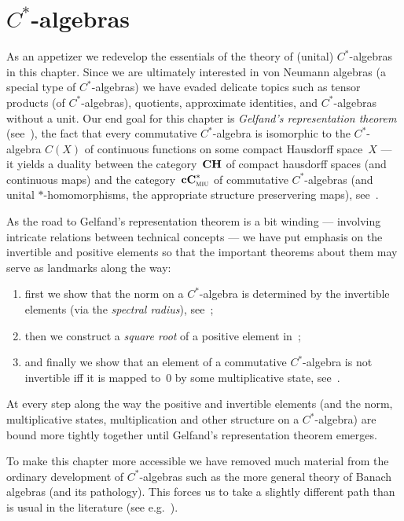 \documentclass[a]{subfiles}
\begin{document}
\chapter{$C^*$-algebras}
As an appetizer
we redevelop the essentials of the theory of (unital) $C^*$-algebras
in this chapter.
Since we are ultimately interested
in von Neumann algebras
(a special type of $C^*$-algebras)
we have evaded
delicate
topics such as tensor products (of $C^*$-algebras), 
quotients, approximate identities,
and $C^*$-algebras without a unit.
Our end goal
for this chapter
is \emph{Gelfand's representation theorem} (see~),
the fact that every commutative $C^*$-algebra
is isomorphic
to the $C^*$-algebra
$C(X)$ of continuous functions on some compact Hausdorff space~$X$
--- it yields a duality
between the category~$\mathbf{CH}$ of compact hausdorff spaces (and continuous maps)
and the category~$\mathbf{cC}^*_{\text{\textsc{miu}}}$ of commutative $C^*$-algebras (and
unital $*$-homomorphisms,
the appropriate structure preservering maps), see~.

As the road to Gelfand's representation theorem 
is a bit winding ---
involving intricate relations between technical concepts --- 
we have put emphasis on the invertible and  positive elements
so that the important
theorems about them may serve as landmarks along the way:
\begin{enumerate}
\item
first we show that the norm
on a $C^*$-algebra
is determined by the invertible elements
(via the \emph{spectral radius}), see~;

\item
then we construct a \emph{square root} of a positive element in~;

\item
and finally we
show that an element of a commutative $C^*$-algebra
is not invertible iff it is mapped to~$0$
by some multiplicative state, see~.
\end{enumerate}
At every step along the way
the positive and invertible elements 
(and the norm, multiplicative states, multiplication
and other structure on a $C^*$-algebra)
are bound more tightly together
until Gelfand's representation theorem emerges.

To make this chapter
more accessible
we have removed
much material
from the ordinary development
of $C^*$-algebras
such as the more general theory of Banach algebras
(and its pathology).
This forces us
to take a slightly different path than is usual in the literature 
(see e.g.~).
\end{document}
